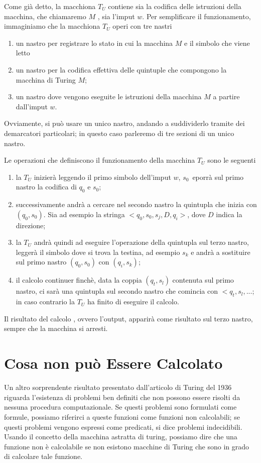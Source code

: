 Come gi\`a detto, la macchiona $T_U$ contiene sia la codifica 
delle istruzioni della macchina, che chiamaremo $M$ , 
sia l'imput $w$. Per semplificare il funzionamento, immaginiamo 
che la macchiona $T_U$ operi con tre nastri
\begin{enumerate}
	\item un nastro per registrare lo stato in cui  la macchina 
$M$ e il simbolo che viene letto
	\item un nastro per la codifica effettiva delle quintuple 
	che compongono la macchina di Turing $M$; 
	\item un nastro dove vengono eseguite le istruzioni della 
	macchina $M$ a partire dall'imput $w$.
\end{enumerate}

Ovviamente, si pu\`o usare un unico nastro, andando a suddividerlo 
tramite dei demarcatori particolari; in questo caso parleremo di tre sezioni
di un unico nastro. 

Le operazioni che definiscono il funzionamento della macchina 
$T_U$ sono le seguenti
\begin{enumerate}
	\item la $T_U$ inizier\`a leggendo il primo simbolo dell'imput $w$, 
	$s_0$\, eporr\`a sul primo nastro la codifica di $q_0$
	e $s_0$;
	\item successivamente andr\`a a cercare nel secondo nastro la quintupla
	che inizia con $(q_0,s_0)$. Sia ad esempio la stringa 
	$<q_0,s_0,s_j,D,q_i>$, dove $D$ indica la direzione;
	\item la $T_U$ andr\`a quindi ad eseguire l'operazione della quintupla
	sul terzo nastro, legger\`a il simbolo dove si trova la testina, ad esempio 
	$s_k$ e andr\`a a sostituire sul primo nastro $(q_0,s_0)$ con $(q_i,s_k)$;
	\item il calcolo continuer finch\`e, data la coppia $(q_t,s_l)$
	contenuta sul primo nastro, ci sar\`a una quintupla sul 
	secondo nastro che comincia con $<q_t,s_l,...$; in caso contrario la $T_U$
	ha finito di eseguire il calcolo.
\end{enumerate}
Il risultato del calcolo , ovvero l'output, apparir\`a come risultato 
sul terzo nastro, sempre che la macchina si arresti. 
 


\section{Cosa non pu\`o Essere Calcolato}
Un altro sorprendente risultato presentato dall'articolo di Turing del
1936 riguarda l'esistenza di problemi ben definiti che non possono
essere risolti da nessuna procedura computazionale. Se questi problemi
sono formulati come formule, possiamo riferirci a queste funzioni come
funzioni non calcolabili; se questi problemi vengono espressi come
predicati, si dice problemi indecidibili. Usando il concetto della
macchina astratta di turing, possiamo dire che una funzione non \`e
calcolabile se non esistono macchine di Turing che sono in grado di
calcolare tale funzione.

